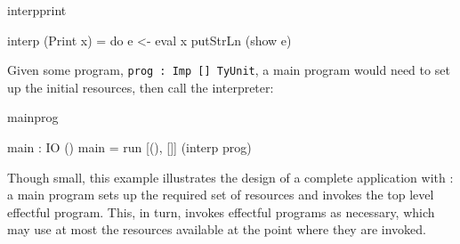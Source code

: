 \begin{SaveVerbatim}{interpprint}

interp (Print x) 
     = do e <- eval x
          putStrLn (show e)

\end{SaveVerbatim}

% 
% 
% 
% 
% 
% 
% 
% 
% 

\noindent
Given some program, \texttt{prog : Imp [] TyUnit}, a main program would need
to set up the initial resources, then call the interpreter:

\begin{SaveVerbatim}{mainprog}

main : IO ()
main = run [(), []] (interp prog)

\end{SaveVerbatim}

\noindent
Though small, this example illustrates the design of a complete application
with \Eff{}: a main program sets up the required set of resources
and invokes the top level effectful program. This, in turn, invokes effectful
programs as necessary, which may use at most the resources available at the
point where they are invoked.

